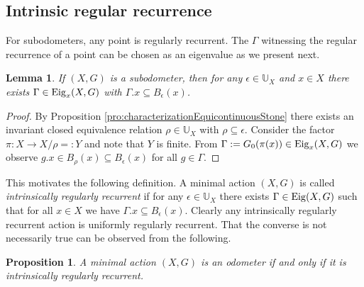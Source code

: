 \documentclass[12pt, reqno]{amsart}
\newtheorem{lemma}[theorem]{Lemma}
\newtheorem{proposition}[theorem]{Proposition}
\theoremstyle{definition}
\theoremstyle{remark}
\numberwithin{equation}{section}
\theoremstyle{theorem}
\theoremstyle{remark}
\def\Eig{{\rm Eig}}
\begin{document}
\subsection{Intrinsic regular recurrence}
\label{subsec:RegularRecurrence_IntrinsicRegularRecurrence}
For subodometers, any point is regularly recurrent. The $\Gamma$ witnessing the regular recurrence of a point can be chosen as an eigenvalue as we present next. 

\begin{lemma}
\label{lem:regularRecurrenceAndEigensets}
If $(X,G)$ is a subodometer, then for any $\epsilon\in \mathbb{U}_X$ and $x\in X$ there exists $\Gamma\in \Eig_x(X,G)$ with
$\Gamma.x\subseteq B_\epsilon(x)$. 
\end{lemma}
\begin{proof}
    By Proposition \ref{pro:characterizationEquicontinuousStone} there exists an invariant closed equivalence relation $\rho\in \mathbb{U}_X$ with $\rho\subseteq \epsilon$. 
    Consider the factor $\pi\colon X\to X/ \rho=:Y$ and note that $Y$ is finite. 
    From $\Gamma:=G_0(\pi(x))\in \Eig_x(X,G)$ we observe $g.x\in B_\rho(x)\subseteq B_\epsilon(x)$ for all $g\in \Gamma$. 
\end{proof}

This motivates the following definition. 
A minimal action $(X,G)$ is called \emph{intrinsically regularly recurrent} if for any $\epsilon\in \mathbb{U}_X$ there exists $\Gamma\in \Eig(X,G)$ such that for all $x\in X$ we have $\Gamma.x\subseteq B_\epsilon(x)$. 
Clearly any intrinsically regularly recurrent action is uniformly regularly recurrent. That the converse is not necessarily true can be observed from the following. 

\begin{proposition}
\label{pro:characterizationOdometerAsIntrinsicallyRegularlyRecurrent}
    A minimal action $(X,G)$ is an odometer if and only if it is intrinsically regularly recurrent. 
\end{proposition}
\end{document}
